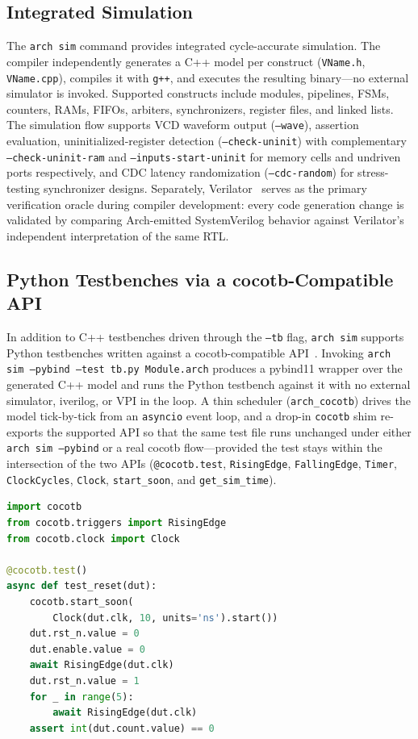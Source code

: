 \documentclass[11pt,twocolumn]{article}
\begin{document}
\subsection{Integrated Simulation}

The \texttt{arch sim} command provides integrated cycle-accurate simulation. The compiler independently generates a C++ model per construct (\texttt{VName.h}, \texttt{VName.cpp}), compiles it with \texttt{g++}, and executes the resulting binary---no external simulator is invoked. Supported constructs include modules, pipelines, FSMs, counters, RAMs, FIFOs, arbiters, synchronizers, register files, and linked lists. The simulation flow supports VCD waveform output (\texttt{--wave}), assertion evaluation, uninitialized-register detection (\texttt{--check-uninit}) with complementary \texttt{--check-uninit-ram} and \texttt{--inputs-start-uninit} for memory cells and undriven ports respectively, and CDC latency randomization (\texttt{--cdc-random}) for stress-testing synchronizer designs. Separately, Verilator~\cite{verilator} serves as the primary verification oracle during compiler development: every code generation change is validated by comparing Arch-emitted SystemVerilog behavior against Verilator's independent interpretation of the same RTL.

\subsection{Python Testbenches via a cocotb-Compatible API}\label{sec:cocotb}

In addition to C++ testbenches driven through the \texttt{--tb} flag, \texttt{arch sim} supports Python testbenches written against a cocotb-compatible API~\cite{cocotb}. Invoking \texttt{arch sim --pybind --test tb.py Module.arch} produces a pybind11 wrapper over the generated C++ model and runs the Python testbench against it with no external simulator, iverilog, or VPI in the loop. A thin scheduler (\texttt{arch\_cocotb}) drives the model tick-by-tick from an \texttt{asyncio} event loop, and a drop-in \texttt{cocotb} shim re-exports the supported API so that the same test file runs unchanged under either \texttt{arch sim --pybind} or a real cocotb flow---provided the test stays within the intersection of the two APIs (\texttt{@cocotb.test}, \texttt{RisingEdge}, \texttt{FallingEdge}, \texttt{Timer}, \texttt{ClockCycles}, \texttt{Clock}, \texttt{start\_soon}, and \texttt{get\_sim\_time}).

\begin{lstlisting}[language=Python,caption={Python testbench against \texttt{arch sim}},label={lst:cocotbtb}]
import cocotb
from cocotb.triggers import RisingEdge
from cocotb.clock import Clock

@cocotb.test()
async def test_reset(dut):
    cocotb.start_soon(
        Clock(dut.clk, 10, units='ns').start())
    dut.rst_n.value = 0
    dut.enable.value = 0
    await RisingEdge(dut.clk)
    dut.rst_n.value = 1
    for _ in range(5):
        await RisingEdge(dut.clk)
    assert int(dut.count.value) == 0
\end{lstlisting}
\end{document}
